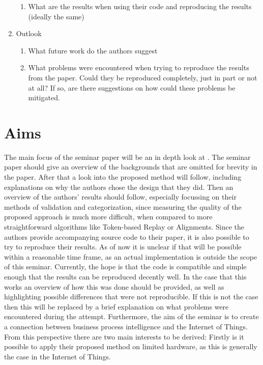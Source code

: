 \documentclass[runningheads]{template/llncs}
\begin{document}
\begin{enumerate}
\begin{enumerate}
		\item What are the results when using their code and reproducing the results (ideally the same)
	\end{enumerate}
	\item Outlook
	\begin{enumerate}
		\item What future work do the authors suggest
		\item What problems were encountered when trying to reproduce the results from the paper. Could they be reproduced completely, just in part or not at all? If so, are there suggestions on how could these problems be mitigated.
	\end{enumerate}
\end{enumerate}

\section{Aims}
The main focus of the seminar paper will be an in depth look at \cite{PBWe20}. The seminar paper should give an overview of the backgrounds that are omitted for brevity in the paper.
After that a look into the proposed method will follow, including explanations on why the authors chose the design that they did.
Then an overview of the authors' results should follow, especially focussing on their methods of validation and categorization, since measuring the quality of the proposed approach is much more difficult, when compared to more straightforward algorithms like Token-based Replay or Alignments.
Since the authors provide accompanying source code to their paper, it is also possible to try to reproduce their results.
As of now it is unclear if that will be possible within a reasonable time frame, as an actual implementation is outside the scope of this seminar.
Currently, the hope is that the code is compatible and simple enough that the results can be reproduced decently well.
In the case that this works an overview of how this was done should be provided, as well as highlighting possible differences that were not reproducible.
If this is not the case then this will be replaced by a brief explanation on what problems were encountered during the attempt.
Furthermore, the aim of the seminar is to create a connection between business process intelligence and the Internet of Things. From this perspective there are two main interests to be derived: Firstly is it possible to apply their proposed method on limited hardware, as this is generally the case in the Internet of Things.  %
\end{document}

